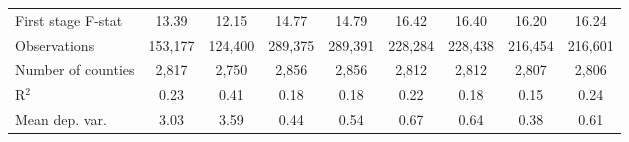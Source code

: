 {\begin{tabular}{l*{8}{c}}
\midrule
First stage F-stat  &       13.39         &       12.15         &       14.77         &       14.79         &       16.42         &       16.40         &       16.20         &       16.24         \\
Observations        &     153,177         &     124,400         &     289,375         &     289,391         &     228,284         &     228,438         &     216,454         &     216,601         \\
Number of counties  &       2,817         &       2,750         &       2,856         &       2,856         &       2,812         &       2,812         &       2,807         &       2,806         \\
R$^2$               &        0.23         &        0.41         &        0.18         &        0.18         &        0.22         &        0.18         &        0.15         &        0.24         \\
Mean dep. var.      &        3.03         &        3.59         &        0.44         &        0.54         &        0.67         &        0.64         &        0.38         &        0.61         \\
\bottomrule
\end{tabular}
}
